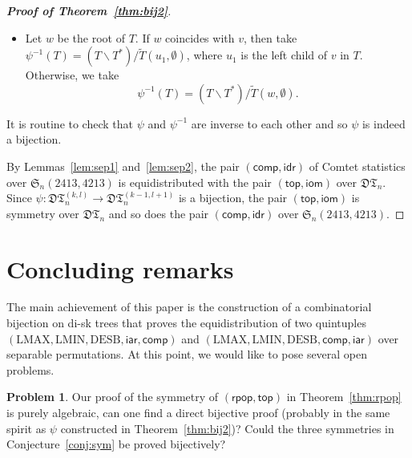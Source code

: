 \documentclass[12pt]{amsart}
\numberwithin{equation}{section}
\theoremstyle{plain}
\theoremstyle{definition}
\newtheorem{?}[theorem]{Problem}
\def\S{\mathfrak{S}}
\def\iar{\mathsf{iar}}
\def\comp{\mathsf{comp}}
\def\LMAX{\mathrm{LMAX}}
\def\LMIN{\mathrm{LMIN}}
\def\LMIN{\mathrm{LMIN}}
\def\DESB{\mathrm{DESB}}
\def\DESB{\mathrm{DESB}}
\newcommand{\DT}{\mathfrak{DT}}
\def\top{\mathsf{top}}
\def\rpop{\mathsf{rpop}}
\def\iom{\mathsf{iom}}
\def\idr{\mathsf{idr}}
\begin{document}
\begin{proof}[{\bf Proof of Theorem~\ref{thm:bij2}}]
\begin{itemize}
\item[Step 3] 
Let $w$ be the root of $T$. If $w$ coincides with $v$, then take $\psi^{-1}(T)=(T\backslash T^*)/\widetilde{T}(u_1,\emptyset)$, where $u_1$ is the left child of $v$ in $T$. Otherwise, we take
$$\psi^{-1}(T)=(T\backslash T^*)/\widetilde{T}(w,\emptyset).$$



\end{itemize}
It is routine to check that $\psi$ and $\psi^{-1}$ are inverse to each other and so $\psi$ is indeed  a bijection. 

By Lemmas~\ref{lem:sep1} and~\ref{lem:sep2}, the pair $(\comp,\idr)$ of Comtet statistics over $\S_n(2413,4213)$ is equidistributed with the pair $(\top,\iom)$ over $\DT_n$. Since $\psi:\DT_n^{(k,l)}\rightarrow \DT_n^{(k-1,l+1)}$ is a bijection, the pair $(\top,\iom)$ is symmetry over $\DT_n$ and so does the pair  $(\comp,\idr)$ over $\S_n(2413,4213)$. 
\end{proof}



\section{Concluding remarks}

\label{sec:fin}

The main achievement of this paper is the construction of a combinatorial bijection on di-sk trees that  proves the equidistribution of  two quintuples $(\LMAX,\LMIN,\DESB,\iar,\comp)$ and $(\LMAX,\LMIN,\DESB,\comp,\iar)$  over separable permutations.
At this point, we would like to pose several open problems.
\begin{?}
Our proof of the symmetry of  $(\rpop,\top)$ in Theorem~\ref{thm:rpop} is purely  algebraic, can one find a direct bijective proof (probably in the same spirit as $\psi$ constructed in Theorem~\ref{thm:bij2})? Could the three symmetries in Conjecture~\ref{conj:sym} be proved bijectively? 
\end{?}
\end{document}
